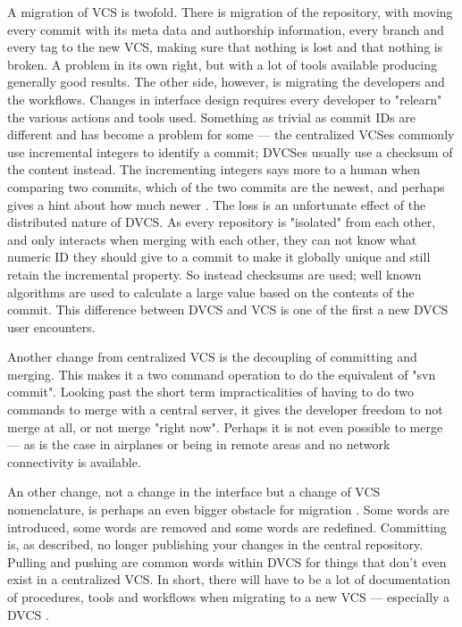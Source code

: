 \documentclass{llncs}
\begin{document}
A migration of VCS is twofold. There is migration of the repository,
with moving every commit with its meta data and authorship
information, every branch and every tag to the new VCS, making sure
that nothing is lost and that nothing is broken. A problem in its own
right, but with a lot of tools available producing generally good
results. The other side, however, is migrating the developers and the
workflows. Changes in interface design requires every developer to
"relearn" the various actions and tools used. Something as trivial as
commit IDs are different and has become a problem for some
\cite{alwis09} --- the centralized VCSes commonly use incremental
integers to identify a commit; DVCSes usually use a checksum of the
content instead. The incrementing integers says more to a human when
comparing two commits, which of the two commits are the newest, and
perhaps gives a hint about how much newer \cite{bird09}. The loss is
an unfortunate effect of the distributed nature of DVCS. As every
repository is "isolated" from each other, and only interacts when
merging with each other, they can not know what numeric ID they should
give to a commit to make it globally unique and still retain the
incremental property.  So instead checksums are used; well known
algorithms are used to calculate a large value based on the contents
of the commit. This difference between DVCS and VCS is one of the
first a new DVCS user encounters.

Another change from centralized VCS is the decoupling of committing
and merging. This makes it a two command operation to do the
equivalent of "svn commit". Looking past the short term
impracticalities of having to do two commands to merge with a central
server, it gives the developer freedom to not merge at all, or not
merge "right now". Perhaps it is not even possible to merge --- as is
the case in airplanes or being in remote areas and no network
connectivity is available.

An other change, not a change in the interface but a change of VCS
nomenclature, is perhaps an even bigger obstacle for migration
\cite{bird09}. Some words are introduced, some words are removed and
some words are redefined. Committing is, as described, no longer
publishing your changes in the central repository. Pulling and pushing
are common words within DVCS for things that don't even exist in a
centralized VCS. In short, there will have to be a lot of
documentation of procedures, tools and workflows when migrating to a
new VCS --- especially a DVCS \cite{alwis09}.
\end{document}
